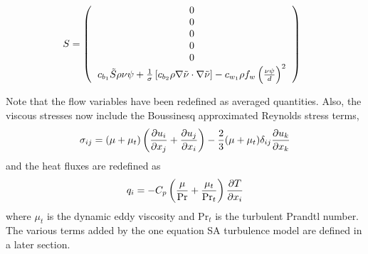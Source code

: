 \begin{equation}
S = \l(
\begin{tabular}{c}
$0$\\
$0$\\
$0$\\
$0$\\
$0$ \\
$c_{b_1}\tilde S \rho\nu\psi + \frac{1}{\sigma}\left[c_{b_2}\rho\nabla\tilde\nu\cdot\nabla\tilde\nu\right] - c_{w_1}\rho f_w \left(\frac{\nu\psi}{d}\right)^2$
\end{tabular}
\r) \;\; 
\end{equation}

Note that the flow variables have been redefined as averaged quantities. Also, the viscous stresses now include the Boussinesq approximated Reynolds stress terms,
\begin{equation}
\sigma_{ij} = (\mu+\mu_t)\left( \frac{\partial u_i}{\partial x_j}
+ \frac{\partial u_j}{\partial x_i} \right)
- \frac{2}{3}(\mu+\mu_t) \delta_{ij}\frac{\partial u_k}{\partial x_k}
\end{equation}
and the heat fluxes are redefined as
\begin{equation}
q_i = -C_p\left( \frac{\mu}{\text{Pr}} + \frac{\mu_t}{\text{Pr}_t}\right)\frac{\partial T}{\partial x_i}
\end{equation}
where $\mu_t$ is the dynamic eddy viscosity and $\text{Pr}_t$ is the turbulent Prandtl number. The various terms added by the one equation SA turbulence model are defined in a later section.